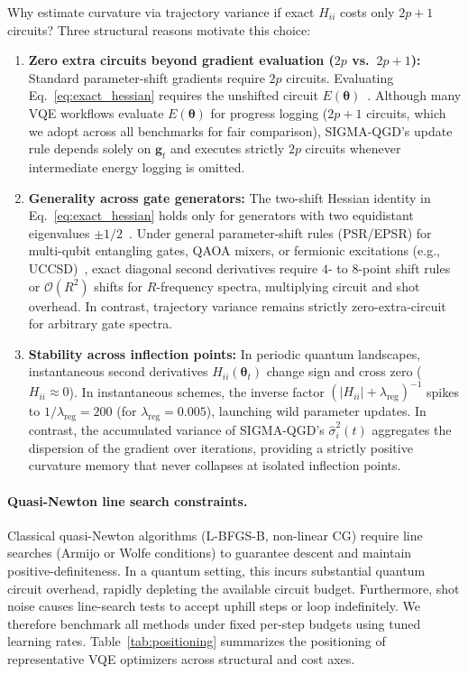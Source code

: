 \documentclass[11pt,a4paper]{article}
\begin{document}
Why estimate curvature via trajectory variance if exact $H_{ii}$ costs only $2p+1$ circuits? Three structural reasons motivate this choice:
\begin{enumerate}
    \item \textbf{Zero extra circuits beyond gradient evaluation ($2p$ vs.\ $2p+1$):} Standard parameter-shift gradients require $2p$ circuits. Evaluating Eq.~\eqref{eq:exact_hessian} requires the unshifted circuit $E(\boldsymbol{\theta})$~\cite{mari2021estimating,wierichs2022general}. Although many VQE workflows evaluate $E(\boldsymbol{\theta})$ for progress logging ($2p+1$ circuits, which we adopt across all benchmarks for fair comparison), SIGMA-QGD's update rule depends solely on $\mathbf{g}_t$ and executes strictly $2p$ circuits whenever intermediate energy logging is omitted.
    \item \textbf{Generality across gate generators:} The two-shift Hessian identity in Eq.~\eqref{eq:exact_hessian} holds only for generators with two equidistant eigenvalues $\pm 1/2$~\cite{mari2021estimating}. Under general parameter-shift rules (PSR/EPSR) for multi-qubit entangling gates, QAOA mixers, or fermionic excitations (e.g., UCCSD)~\cite{wierichs2022general}, exact diagonal second derivatives require $4$- to $8$-point shift rules or $\mathcal{O}(R^2)$ shifts for $R$-frequency spectra, multiplying circuit and shot overhead. In contrast, trajectory variance remains strictly zero-extra-circuit for arbitrary gate spectra.
    \item \textbf{Stability across inflection points:} In periodic quantum landscapes, instantaneous second derivatives $H_{ii}(\boldsymbol{\theta}_t)$ change sign and cross zero ($H_{ii} \approx 0$). In instantaneous schemes, the inverse factor $(|H_{ii}| + \lambda_{\text{reg}})^{-1}$ spikes to $1/\lambda_{\text{reg}} = 200$ (for $\lambda_{\text{reg}} = 0.005$), launching wild parameter updates. In contrast, the accumulated variance of SIGMA-QGD's $\hat{\sigma}_i^2(t)$ aggregates the dispersion of the gradient over iterations, providing a strictly positive curvature memory that never collapses at isolated inflection points.
\end{enumerate}

\paragraph{Quasi-Newton line search constraints.}
Classical quasi-Newton algorithms (L-BFGS-B, non-linear CG) require line searches (Armijo or Wolfe conditions) to guarantee descent and maintain positive-definiteness. In a quantum setting, this incurs substantial quantum circuit overhead, rapidly depleting the available circuit budget. Furthermore, shot noise causes line-search tests to accept uphill steps or loop indefinitely. We therefore benchmark all methods under fixed per-step budgets using tuned learning rates. Table~\ref{tab:positioning} summarizes the positioning of representative VQE optimizers across structural and cost axes.
\end{document}
